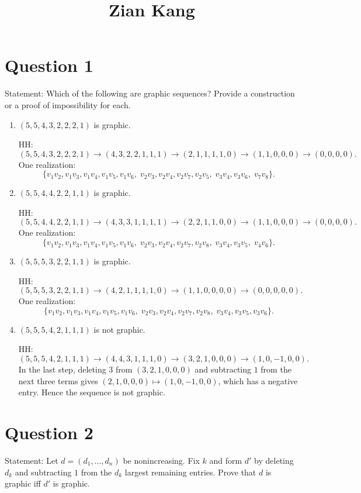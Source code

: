 \documentclass[11pt]{article}
\title{Zian Kang}
\date{}
\begin{document}
\maketitle


\section*{Question 1}
\noindent Statement: Which of the following are graphic sequences? Provide a construction or a proof of impossibility for each.

\medskip


\begin{enumerate}[label=(\alph*), itemsep=10pt, leftmargin=*]
\item $(5,5,4,3,2,2,2,1)$ is graphic.

HH:
\[
(5,5,4,3,2,2,2,1)\to(4,3,2,2,1,1,1)\to(2,1,1,1,1,0)\to(1,1,0,0,0)\to(0,0,0,0).
\]
One realization:
\[
\{v_1v_2,v_1v_3,v_1v_4,v_1v_5,v_1v_6,\;
  v_2v_3,v_2v_4,v_2v_7,v_2v_5,\;
  v_3v_4,v_3v_6,\;
  v_7v_8\}.
\]

\item $(5,5,4,4,2,2,1,1)$ is graphic.

HH:
\[
(5,5,4,4,2,2,1,1)\to(4,3,3,1,1,1,1)\to(2,2,1,1,0,0)\to(1,1,0,0,0)\to(0,0,0,0).
\]
One realization:
\[
\{v_1v_2,v_1v_3,v_1v_4,v_1v_5,v_1v_6,\;
  v_2v_3,v_2v_4,v_2v_7,v_2v_8,\;
  v_3v_4,v_3v_5,\;
  v_4v_6\}.
\]

\item $(5,5,5,3,2,2,1,1)$ is graphic.

HH:
\[
(5,5,5,3,2,2,1,1)\to(4,2,1,1,1,1,0)\to(1,1,0,0,0,0)\to(0,0,0,0,0).
\]
One realization:
\[
\{v_1v_2,v_1v_3,v_1v_4,v_1v_5,v_1v_6,\;
  v_2v_3,v_2v_4,v_2v_7,v_2v_8,\;
  v_3v_4,v_3v_5,v_3v_6\}.
\]

\item $(5,5,5,4,2,1,1,1)$ is not graphic.

HH:
\[
(5,5,5,4,2,1,1,1)
\to (4,4,3,1,1,1,0)
\to (3,2,1,0,0,0)
\to (1,0,-1,0,0).
\]
In the last step, deleting $3$ from $(3,2,1,0,0,0)$ and subtracting $1$ from the next three terms gives
$(2,1,0,0,0)\mapsto(1,0,-1,0,0)$, which has a negative entry. Hence the sequence is not graphic.
\end{enumerate}

\newpage
\section*{Question 2}
\noindent Statement: Let $d=(d_1,\dots,d_n)$ be nonincreasing. Fix $k$ and form $d'$ by deleting $d_k$
and subtracting $1$ from the $d_k$ largest remaining entries. Prove that $d$ is graphic iff $d'$ is graphic.
\end{document}
